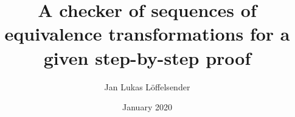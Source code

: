 \documentclass[rnd]{mas_report}
\author{Jan Lukas Löffelsender}
\title{A checker of sequences of equivalence transformations for a given step-by-step proof}
\date{January 2020}
\begin{document}
\frontmatter

\begin{titlepage}
    \maketitle
\end{titlepage}

\pagestyle{plain}
\cleardoublepage
\statementpage
\let\cleardoublepage\clearpage

%
\let\cleardoublepage\clearpage
\tableofcontents
\let\cleardoublepage\clearpage
\listoffigures
\let\cleardoublepage\clearpage
\lstlistoflistings
\let\cleardoublepage\clearpage
\listoftables
\newpage
\thispagestyle{plain} %
\mbox{}

\mainmatter %
\pagestyle{mainmatter}

\let\cleardoublepage\clearpage

\let\cleardoublepage\clearpage

\let\cleardoublepage\clearpage

\let\cleardoublepage\clearpage

\let\cleardoublepage\clearpage

\let\cleardoublepage\clearpage

\let\cleardoublepage\clearpage

\let\cleardoublepage\clearpage

\begin{appendices}
    
\end{appendices}

\backmatter

\end{document}
